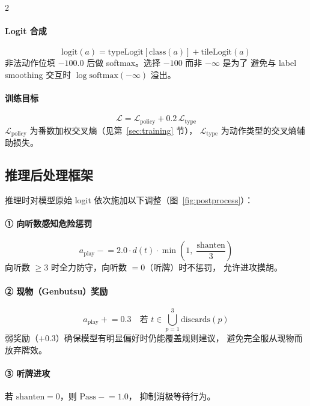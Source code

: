 \documentclass{article}
\newcommand{\calL}{\mathcal{L}}
\begin{document}
\begin{multicols}{2}
\paragraph{Logit 合成}
\begin{equation}
\text{logit}(a) = \text{typeLogit}[\text{class}(a)] + \text{tileLogit}(a)
\end{equation}
非法动作位填 $-100.0$ 后做 softmax。选择 $-100$ 而非 $-\infty$ 是为了
避免与 label smoothing 交互时 $\log\text{softmax}(-\infty)$ 溢出。

\paragraph{训练目标}
\begin{equation}
\calL = \calL_{\text{policy}} + 0.2\,\calL_{\text{type}}
\end{equation}
$\calL_{\text{policy}}$ 为番数加权交叉熵（见第~\ref{sec:training} 节），
$\calL_{\text{type}}$ 为动作类型的交叉熵辅助损失。

\subsection{推理后处理框架}

推理时对模型原始 logit 依次施加以下调整（图~\ref{fig:postprocess}）：

\paragraph{① 向听数感知危险惩罚}
\begin{equation}
a_{\text{play}} \mathrel{-}= 2.0 \cdot d(t) \cdot
\min\!\left(1,\; \frac{\text{shanten}}{3}\right)
\label{eq:danger_pen}
\end{equation}
向听数 $\geq 3$ 时全力防守，向听数 $=0$（听牌）时不惩罚，
允许进攻摸胡。

\paragraph{② 现物（Genbutsu）奖励}
\begin{equation}
a_{\text{play}} \mathrel{+}= 0.3
\quad \text{若 } t \in \bigcup_{p=1}^{3}\text{discards}(p)
\label{eq:genbutsu}
\end{equation}
弱奖励（$+0.3$）确保模型有明显偏好时仍能覆盖规则建议，
避免完全服从现物而放弃牌效。

\paragraph{③ 听牌进攻}
若 $\text{shanten}=0$，则 $\text{Pass} \mathrel{-}= 1.0$，
抑制消极等待行为。


\end{multicols}
\end{document}
